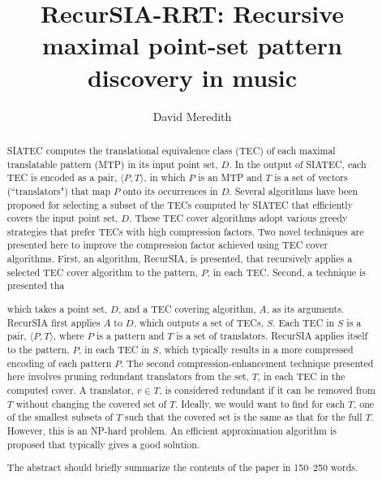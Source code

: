 \documentclass[runningheads]{llncs}
\begin{document}
%
\title{RecurSIA-RRT: Recursive maximal point-set pattern discovery in music}
%
%
\author{David Meredith}
%
%
%
\maketitle              %
%
\begin{abstract}
SIATEC computes the translational equivalence class (TEC) of each
maximal translatable pattern (MTP) in its input point set, $D$. In the
output of SIATEC, each TEC is encoded as a pair, $\langle P,
T\rangle$, in which $P$ is an MTP and $T$ is a set of vectors
(``translators") that map $P$ onto its occurrences in $D$. Several
algorithms have been proposed for selecting a subset of the TECs
computed by SIATEC that efficiently covers the input point set,
$D$. These TEC cover algorithms adopt various greedy strategies that
prefer TECs with high compression factors. Two novel techniques are
presented here to improve the compression factor achieved using TEC
cover algorithms.  First, an algorithm, RecurSIA, is presented, that
recursively applies a selected TEC cover algorithm to the pattern,
$P$, in each TEC. Second, a technique is presented tha

which takes a point set, $D$, and a TEC covering algorithm, $A$, as
its arguments.  RecurSIA first applies $A$ to $D$, which outputs a set
of TECs, $S$. Each TEC in $S$ is a pair, $\langle P,T\rangle$, where
$P$ is a pattern and $T$ is a set of translators. RecurSIA applies
itself to the pattern, $P$, in each TEC in $S$, which typically
results in a more compressed encoding of each pattern $P$. The second
compression-enhancement technique presented here involves pruning
redundant translators from the set, $T$, in each TEC in the computed
cover. A translator, $v\in T$, is considered redundant if it can be
removed from $T$ without changing the covered set of $T$. Ideally, we
would want to find for each $T$, one of the smallest subsets of $T$
such that the covered set is the same as that for the full
$T$. However, this is an NP-hard problem. An efficient approximation
algorithm is proposed that typically gives a good solution.

The abstract should briefly summarize the contents of the paper in
150--250 words.

\end{abstract}
%
%
%
\end{document}
